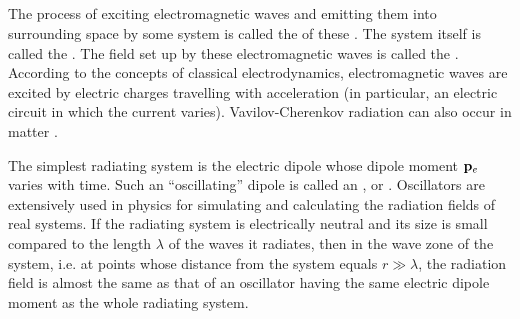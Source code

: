 \subsection{}\label{31.3.1} The process of exciting electromagnetic waves and emitting them into surrounding space by some system is called the  of these . The system itself is called the . The field set up by these electromagnetic waves is called the . According to the concepts of classical electrodynamics, electromagnetic waves are excited by electric charges travelling with acceleration (in particular, an electric circuit in which the current varies). Vavilov-Cherenkov radiation can also occur in matter .

The simplest radiating system is the electric dipole  whose dipole moment $\vb{p}_{e}$ varies with time. Such an ``oscillating'' dipole is called an , or . Oscillators are extensively used in physics for simulating and calculating the radiation fields of real systems. If the radiating system is electrically neutral and its size is small compared to the length $\lambda$ of the waves it radiates, then in the wave zone of the system, i.e. at points whose distance from the system equals $r \gg \lambda$, the radiation field is almost the same as that of an oscillator having the same electric dipole moment as the whole radiating system.

